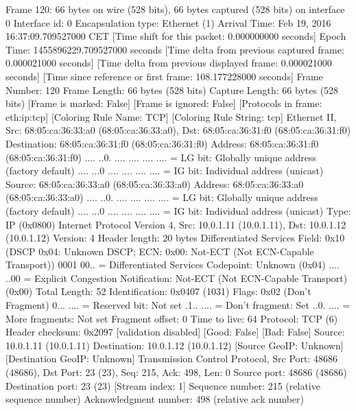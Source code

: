 Frame 120: 66 bytes on wire (528 bits), 66 bytes captured (528 bits) on interface 0
    Interface id: 0
    Encapsulation type: Ethernet (1)
    Arrival Time: Feb 19, 2016 16:37:09.709527000 CET
    [Time shift for this packet: 0.000000000 seconds]
    Epoch Time: 1455896229.709527000 seconds
    [Time delta from previous captured frame: 0.000021000 seconds]
    [Time delta from previous displayed frame: 0.000021000 seconds]
    [Time since reference or first frame: 108.177228000 seconds]
    Frame Number: 120
    Frame Length: 66 bytes (528 bits)
    Capture Length: 66 bytes (528 bits)
    [Frame is marked: False]
    [Frame is ignored: False]
    [Protocols in frame: eth:ip:tcp]
    [Coloring Rule Name: TCP]
    [Coloring Rule String: tcp]
Ethernet II, Src: 68:05:ca:36:33:a0 (68:05:ca:36:33:a0), Dst: 68:05:ca:36:31:f0 (68:05:ca:36:31:f0)
    Destination: 68:05:ca:36:31:f0 (68:05:ca:36:31:f0)
        Address: 68:05:ca:36:31:f0 (68:05:ca:36:31:f0)
        .... ..0. .... .... .... .... = LG bit: Globally unique address (factory default)
        .... ...0 .... .... .... .... = IG bit: Individual address (unicast)
    Source: 68:05:ca:36:33:a0 (68:05:ca:36:33:a0)
        Address: 68:05:ca:36:33:a0 (68:05:ca:36:33:a0)
        .... ..0. .... .... .... .... = LG bit: Globally unique address (factory default)
        .... ...0 .... .... .... .... = IG bit: Individual address (unicast)
    Type: IP (0x0800)
Internet Protocol Version 4, Src: 10.0.1.11 (10.0.1.11), Dst: 10.0.1.12 (10.0.1.12)
    Version: 4
    Header length: 20 bytes
    Differentiated Services Field: 0x10 (DSCP 0x04: Unknown DSCP; ECN: 0x00: Not-ECT (Not ECN-Capable Transport))
        0001 00.. = Differentiated Services Codepoint: Unknown (0x04)
        .... ..00 = Explicit Congestion Notification: Not-ECT (Not ECN-Capable Transport) (0x00)
    Total Length: 52
    Identification: 0x0407 (1031)
    Flags: 0x02 (Don't Fragment)
        0... .... = Reserved bit: Not set
        .1.. .... = Don't fragment: Set
        ..0. .... = More fragments: Not set
    Fragment offset: 0
    Time to live: 64
    Protocol: TCP (6)
    Header checksum: 0x2097 [validation disabled]
        [Good: False]
        [Bad: False]
    Source: 10.0.1.11 (10.0.1.11)
    Destination: 10.0.1.12 (10.0.1.12)
    [Source GeoIP: Unknown]
    [Destination GeoIP: Unknown]
Transmission Control Protocol, Src Port: 48686 (48686), Dst Port: 23 (23), Seq: 215, Ack: 498, Len: 0
    Source port: 48686 (48686)
    Destination port: 23 (23)
    [Stream index: 1]
    Sequence number: 215    (relative sequence number)
    Acknowledgment number: 498    (relative ack number)
